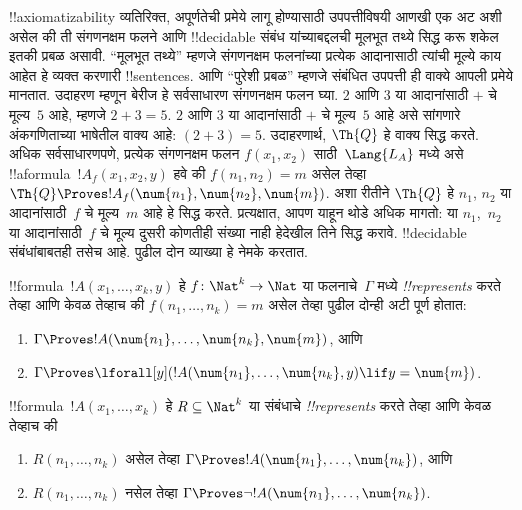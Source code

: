 \documentclass[../../../include/open-logic-section]{subfiles}
\begin{document}
!!{axiomatizability} व्यतिरिक्त, अपूर्णतेची प्रमेये लागू होण्यासाठी
उपपत्तीविषयी आणखी एक अट अशी असेल की ती संगणनक्षम फलने आणि
!!{decidable} संबंध यांच्याबद्दलची मूलभूत तथ्ये सिद्ध करू शकेल इतकी
प्रबळ असावी. ``मूलभूत तथ्ये'' म्हणजे संगणनक्षम फलनांच्या प्रत्येक
आदानासाठी त्यांची मूल्ये काय आहेत हे व्यक्त करणारी !!{sentence}s.
आणि ``पुरेशी प्रबळ'' म्हणजे संबंधित उपपत्ती ही वाक्ये आपली प्रमेये
मानतात. उदाहरण म्हणून बेरीज हे सर्वसाधारण संगणनक्षम फलन घ्या.
$2$ आणि $3$ या आदानांसाठी $+$ चे मूल्य~$5$ आहे, म्हणजे
$2+3 = 5$. $2$ आणि $3$ या आदानांसाठी $+$ चे मूल्य~$5$ आहे
असे सांगणारे अंकगणिताच्या भाषेतील वाक्य आहे:
$(\num{2} + \num{3}) = \num{5}$. उदाहरणार्थ, $\Th{Q}$ हे वाक्य
सिद्ध करते. अधिक सर्वसाधारणपणे, प्रत्येक संगणनक्षम फलन
$f(x_1, x_2)$ साठी~$\Lang{L_A}$ मध्ये असे !!a{formula}~$!A_f(x_1,
x_2, y)$ हवे की $f(n_1, n_2) = m$ असेल तेव्हा $\Th{Q}
\Proves !A_f(\num{n_1}, \num{n_2}, \num{m})$. अशा रीतीने
$\Th{Q}$ हे $n_1$, $n_2$ या आदानांसाठी~$f$ चे मूल्य~$m$
आहे हे सिद्ध करते. प्रत्यक्षात, आपण याहून थोडे अधिक मागतो:
या $n_1$,~$n_2$ या आदानांसाठी~$f$ चे मूल्य दुसरी कोणतीही संख्या नाही हेदेखील
तिने सिद्ध करावे. !!{decidable} संबंधांबाबतही तसेच आहे. पुढील
दोन व्याख्या हे नेमके करतात.

\begin{defn}
!!{formula}~$!A(x_1, \dots, x_k, y)$ हे
$f\colon \Nat^k \to \Nat$ या फलनाचे~$\Gamma$ मध्ये
\emph{!!{represents}} करते तेव्हा आणि केवळ तेव्हाच की $f(n_1,
\dots, n_k) = m$ असेल तेव्हा पुढील दोन्ही अटी पूर्ण होतात:
\begin{enumerate}
\item $\Gamma \Proves !A(\num{n_1}, \dots, \num{n_k}, \num{m})$, आणि
\item $\Gamma \Proves \lforall[y](!A(\num{n_1}, \dots, \num{n_k},
y) \lif y = \num{m})$.
\end{enumerate}
\end{defn}

\begin{defn}
!!{formula}~$!A(x_1, \dots, x_k)$ हे
$R \subseteq \Nat^k$ या संबंधाचे \emph{!!{represents}} करते तेव्हा आणि केवळ तेव्हाच की
\begin{enumerate}
\item $R(n_1, \dots, n_k)$ असेल तेव्हा $\Gamma \Proves !A(\num{n_1},
\dots, \num{n_k})$, आणि
\item $R(n_1, \dots, n_k)$ नसेल तेव्हा $\Gamma \Proves \lnot
!A(\num{n_1}, \dots, \num{n_k})$.
\end{enumerate}
\end{defn}
\end{document}

